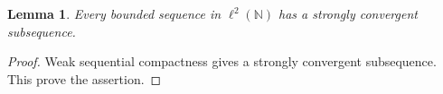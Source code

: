 \documentclass{article}
\newtheorem{lemma}{Lemma}
\begin{document}
\begin{lemma}\label{lem:hilbert}
Every bounded sequence in $\ell^2(\mathbb N)$ has a strongly convergent subsequence.
\end{lemma}
\begin{proof}
Weak sequential compactness gives a strongly convergent subsequence.
This prove the assertion.
\end{proof}
\end{document}
